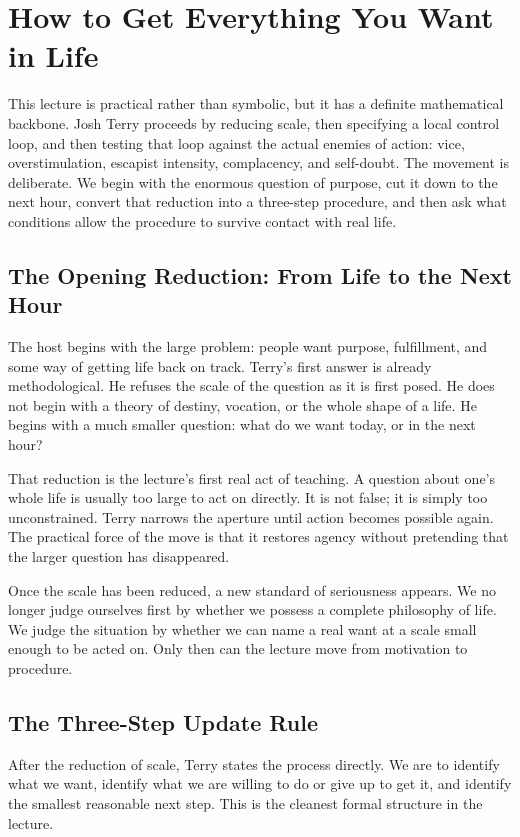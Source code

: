 \chapter{How to Get Everything You Want in Life}

This lecture is practical rather than symbolic, but it has a definite mathematical backbone. Josh Terry proceeds by reducing scale, then specifying a local control loop, and then testing that loop against the actual enemies of action: vice, overstimulation, escapist intensity, complacency, and self-doubt. The movement is deliberate. We begin with the enormous question of purpose, cut it down to the next hour, convert that reduction into a three-step procedure, and then ask what conditions allow the procedure to survive contact with real life.

\section{The Opening Reduction: From Life to the Next Hour}

The host begins with the large problem: people want purpose, fulfillment, and some way of getting life back on track. Terry's first answer is already methodological. He refuses the scale of the question as it is first posed. He does not begin with a theory of destiny, vocation, or the whole shape of a life. He begins with a much smaller question: what do we want today, or in the next hour?

That reduction is the lecture's first real act of teaching. A question about one's whole life is usually too large to act on directly. It is not false; it is simply too unconstrained. Terry narrows the aperture until action becomes possible again. The practical force of the move is that it restores agency without pretending that the larger question has disappeared.

Once the scale has been reduced, a new standard of seriousness appears. We no longer judge ourselves first by whether we possess a complete philosophy of life. We judge the situation by whether we can name a real want at a scale small enough to be acted on. Only then can the lecture move from motivation to procedure.

\section{The Three-Step Update Rule}

After the reduction of scale, Terry states the process directly. We are to identify what we want, identify what we are willing to do or give up to get it, and identify the smallest reasonable next step. This is the cleanest formal structure in the lecture.

